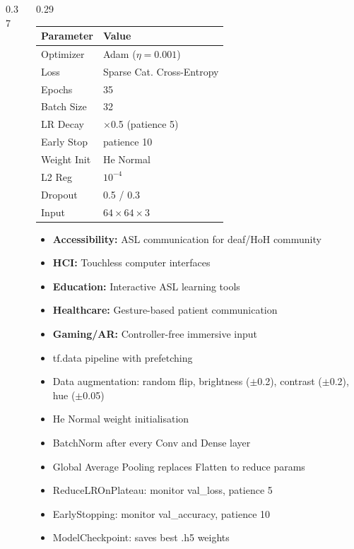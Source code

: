 \documentclass[final]{beamer}
\newcommand{\seccard}[2]{%
  \begin{tcolorbox}[postercard, title={#1}]#2\end{tcolorbox}%
}
\newcommand{\hitem}[1]{\item \textbf{\textcolor{upesblue}{#1}}}
\renewcommand{\scriptsize}{\fontsize{8}{9.5}\selectfont}
\begin{document}
\begin{frame}[t]{}
\begin{tcolorbox}[
  enhanced,
  colback=white,
  colframe=upesblue,
  boxrule=4pt,
  arc=0pt,
  left=10pt, right=10pt, top=10pt, bottom=10pt,
  width=\textwidth,
]
\begin{columns}[T]
\begin{column}{0.37\textwidth}
\end{column}

\begin{column}{0.29\textwidth}

\seccard{Hyperparameters}{
\scriptsize
\begin{tabular}{@{}ll@{}}
\toprule
\textbf{Parameter} & \textbf{Value} \\
\midrule
Optimizer & Adam ($\eta=0.001$) \\
Loss & Sparse Cat. Cross-Entropy \\
Epochs & 35 \\
Batch Size & 32 \\
LR Decay & $\times$0.5 (patience 5) \\
Early Stop & patience 10 \\
Weight Init & He Normal \\
L2 Reg & $10^{-4}$ \\
Dropout & 0.5 / 0.3 \\
Input & $64\times64\times3$ \\
\bottomrule
\end{tabular}
}

\vspace{5pt}

\seccard{Applications}{
\scriptsize
\begin{itemize}\setlength\itemsep{2pt}
  \hitem{Accessibility:} ASL communication for deaf/HoH community
  \hitem{HCI:} Touchless computer interfaces
  \hitem{Education:} Interactive ASL learning tools
  \hitem{Healthcare:} Gesture-based patient communication
  \hitem{Gaming/AR:} Controller-free immersive input
\end{itemize}
}

\vspace{5pt}

\seccard{Training Configuration}{
\scriptsize
\begin{itemize}\setlength\itemsep{2pt}
  \item tf.data pipeline with prefetching
  \item Data augmentation: random flip, brightness ($\pm$0.2), contrast ($\pm$0.2), hue ($\pm$0.05)
  \item He Normal weight initialisation
  \item BatchNorm after every Conv and Dense layer
  \item Global Average Pooling replaces Flatten to reduce params
  \item ReduceLROnPlateau: monitor val\_loss, patience 5
  \item EarlyStopping: monitor val\_accuracy, patience 10
  \item ModelCheckpoint: saves best .h5 weights
\end{itemize}
}


\end{column}
\end{columns}
\end{tcolorbox}
\end{frame}
\end{document}

